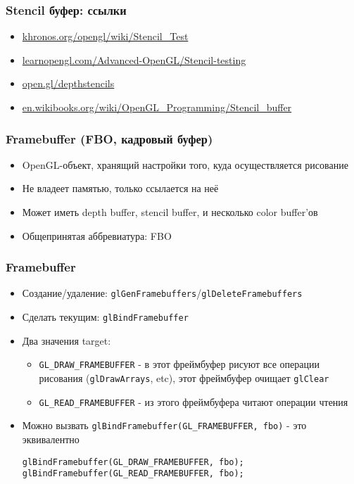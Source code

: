 \documentclass{beamer}
\begin{document}
\begin{frame}[fragile]
\frametitle{Stencil буфер: ссылки}
\begin{itemize}
\item \href{https://www.khronos.org/opengl/wiki/Stencil_Test}{khronos.org/opengl/wiki/Stencil\_Test}
\item \href{https://learnopengl.com/Advanced-OpenGL/Stencil-testing}{learnopengl.com/Advanced-OpenGL/Stencil-testing}
\item \href{https://open.gl/depthstencils}{open.gl/depthstencils}
\item \href{https://en.wikibooks.org/wiki/OpenGL_Programming/Stencil_buffer}{en.wikibooks.org/wiki/OpenGL\_Programming/Stencil\_buffer}
\end{itemize}
\end{frame}

\begin{frame}[fragile]
\frametitle{Framebuffer (FBO, кадровый буфер)}
\begin{itemize}
\item OpenGL-объект, хранящий настройки того, куда осуществляется рисование
\pause
\item Не владеет памятью, только ссылается на неё
\pause
\item Может иметь depth buffer, stencil buffer, и несколько color buffer'ов
\pause
\item Общепринятая аббревиатура: FBO
\end{itemize}
\end{frame}

\begin{frame}[fragile]
\frametitle{Framebuffer}
\begin{itemize}
\item Создание/удаление: \verb|glGenFramebuffers|/\verb|glDeleteFramebuffers|
\pause
\item Сделать текущим: \verb|glBindFramebuffer|
\pause
\item Два значения target:
\begin{itemize}
\item \verb|GL_DRAW_FRAMEBUFFER| - в этот фреймбуфер рисуют все операции рисования (\verb|glDrawArrays|, etc), этот фреймбуфер очищает \verb|glClear|
\pause
\item \verb|GL_READ_FRAMEBUFFER| - из этого фреймбуфера читают операции чтения
\end{itemize}  
\pause
\item Можно вызвать \verb|glBindFramebuffer(GL_FRAMEBUFFER, fbo)| - это эквивалентно
\begin{verbatim}
glBindFramebuffer(GL_DRAW_FRAMEBUFFER, fbo);
glBindFramebuffer(GL_READ_FRAMEBUFFER, fbo);
\end{verbatim}
\end{itemize}
\end{frame}
\end{document}
